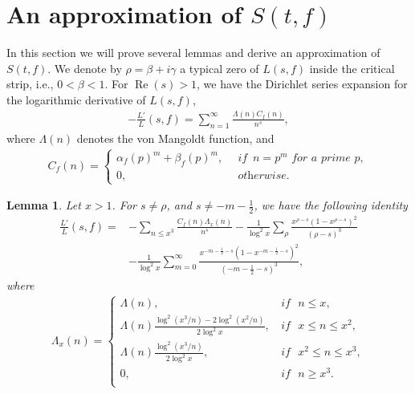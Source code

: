 \documentclass[10pt,a4paper]{amsart}
\newtheorem{lemma}{Lemma}
\renewcommand{\Re}{\operatorname{Re}}
\newcommand{\bea}{\begin{eqnarray}}
\newcommand{\bna}{\begin{eqnarray*}}
\newcommand{\eea}{\end{eqnarray}}
\newcommand{\ena}{\end{eqnarray*}}
\begin{document}
\section{An approximation of $S(t,f)$}
In this section we will prove several lemmas and derive an approximation of $S(t,f)$.
We denote by $\rho=\beta+i\gamma$ a typical zero of $L(s,f)$ inside the critical strip, i.e., $0<\beta<1$.
For $\Re(s)>1$, we have the Dirichlet series expansion for the logarithmic derivative of $L(s,f)$,
\bea\label{Log derivative definition}
-\frac{L'}{L}(s,f)=\sum_{n=1}^\infty \frac{\Lambda(n)C_f(n)}{n^s},
\eea
where $\Lambda(n)$ denotes the von Mangoldt function, and
\bea\label{Log derivative coefficient}
C_f(n)=\begin{cases}
\alpha_f(p)^m+\beta_f(p)^m, \,&\textit{ if }\, n=p^m\,\, \textit{for a prime}\,\,p,\\
0, \,& \textit{ otherwise}.
\end{cases}
\eea
\begin{lemma}\label{lemma 1}
Let $x>1$. For $s\neq \rho$, and $s\neq -m-\frac{1}{2}$, we have the following identity
\begin{equation*}
\begin{split}
\frac{L'}{L}(s,f)=&-\sum_{n\leq x^3} \frac{C_f(n)\Lambda_x(n)}{n^s}
-\frac{1}{\log^2x}\sum_\rho\frac{x^{\rho-s}(1-x^{\rho-s})^2}{(\rho-s)^3}\\
&-\frac{1}{\log^2x}\sum_{m=0}^\infty\frac{x^{-m-\frac{1}{2}-s}(1-x^{-m-\frac{1}{2}-s})^2}{(-m-\frac{1}{2}-s)^3},
\end{split}
\end{equation*}
where
\bna
\Lambda_x(n)=\begin{cases}
\Lambda(n), \,&\textit{if }\,\,n\leq x,\\
\Lambda(n)\frac{\log^2(x^3/n)-2\log^2(x^2/n)}{2\log^2x}, \,& \textit{if }\,\,x\leq n\leq x^2,\\
\Lambda(n)\frac{\log^2(x^3/n)}{2\log^2x}, \,& \textit{if }\,\,x^2\leq n\leq x^3,\\
0, \,& \textit{if }\,\,n\geq x^3.\\
\end{cases}
\ena
\end{lemma}
\end{document}
